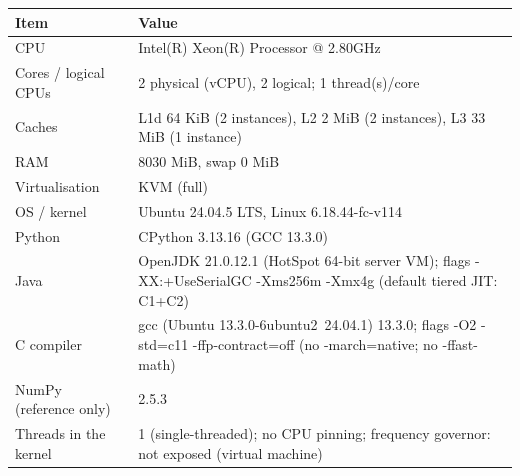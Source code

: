 \begin{tabular}{lp{10.5cm}}
\toprule
Item & Value \\
\midrule
CPU & Intel(R) Xeon(R) Processor @ 2.80GHz \\
Cores / logical CPUs & 2 physical (vCPU), 2 logical; 1 thread(s)/core \\
Caches & L1d 64 KiB (2 instances), L2 2 MiB (2 instances), L3 33 MiB (1 instance) \\
RAM & 8030 MiB, swap 0 MiB \\
Virtualisation & KVM (full) \\
OS / kernel & Ubuntu 24.04.5 LTS, Linux 6.18.44-fc-v114 \\
Python & CPython 3.13.16 (GCC 13.3.0) \\
Java & OpenJDK 21.0.12.1 (HotSpot 64-bit server VM); flags -XX:+UseSerialGC -Xms256m -Xmx4g (default tiered JIT: C1+C2) \\
C compiler & gcc (Ubuntu 13.3.0-6ubuntu2~24.04.1) 13.3.0; flags -O2 -std=c11 -ffp-contract=off  (no -march=native; no -ffast-math) \\
NumPy (reference only) & 2.5.3 \\
Threads in the kernel & 1 (single-threaded); no CPU pinning; frequency governor: not exposed (virtual machine) \\
\bottomrule
\end{tabular}
